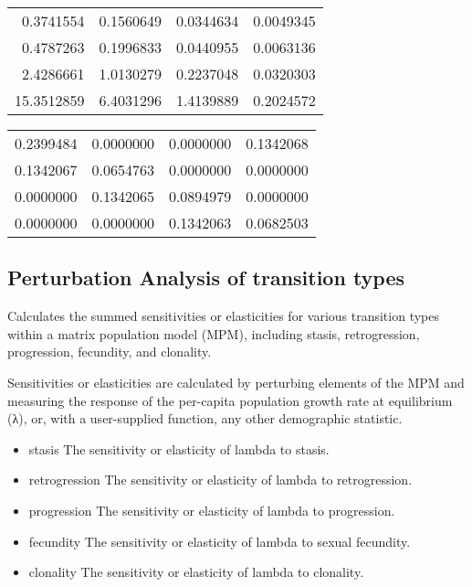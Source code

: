 \documentclass[
]{article}
\providecommand{\tightlist}{%
  \setlength{\itemsep}{0pt}\setlength{\parskip}{0pt}}
\begin{document}
\begin{tabular}{rrrr}
\toprule
0.3741554 & 0.1560649 & 0.0344634 & 0.0049345\\
0.4787263 & 0.1996833 & 0.0440955 & 0.0063136\\
2.4286661 & 1.0130279 & 0.2237048 & 0.0320303\\
15.3512859 & 6.4031296 & 1.4139889 & 0.2024572\\
\bottomrule
\end{tabular}

\begin{tabular}{rrrr}
\toprule
0.2399484 & 0.0000000 & 0.0000000 & 0.1342068\\
0.1342067 & 0.0654763 & 0.0000000 & 0.0000000\\
0.0000000 & 0.1342065 & 0.0894979 & 0.0000000\\
0.0000000 & 0.0000000 & 0.1342063 & 0.0682503\\
\bottomrule
\end{tabular}

\newpage

\hypertarget{perturbation-analysis-of-transition-types}{%
\subsection{Perturbation Analysis of transition
types}\label{perturbation-analysis-of-transition-types}}

Calculates the summed sensitivities or elasticities for various
transition types within a matrix population model (MPM), including
stasis, retrogression, progression, fecundity, and clonality.

Sensitivities or elasticities are calculated by perturbing elements of
the MPM and measuring the response of the per-capita population growth
rate at equilibrium (λ), or, with a user-supplied function, any other
demographic statistic.

\begin{itemize}
\tightlist
\item
  stasis The sensitivity or elasticity of lambda to stasis.
\item
  retrogression The sensitivity or elasticity of lambda to
  retrogression.
\item
  progression The sensitivity or elasticity of lambda to progression.
\item
  fecundity The sensitivity or elasticity of lambda to sexual fecundity.
\item
  clonality The sensitivity or elasticity of lambda to clonality.
\end{itemize}
\end{document}
